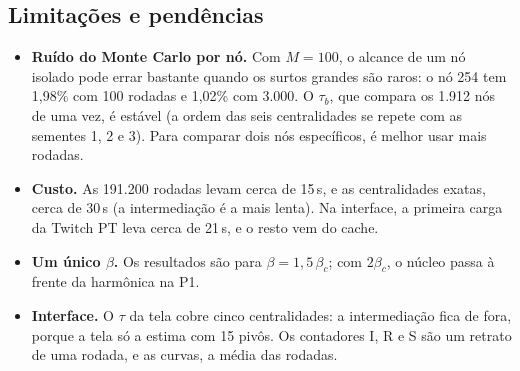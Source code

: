\subsection{Limitações e pendências}
\begin{itemize}[leftmargin=*]
  \item \textbf{Ruído do Monte Carlo por nó.} Com $M = 100$, o alcance de um nó isolado pode
        errar bastante quando os surtos grandes são raros: o nó 254 tem 1,98\% com 100 rodadas e
        1,02\% com 3.000. O $\tau_b$, que compara os 1.912 nós de uma vez, é estável (a ordem das
        seis centralidades se repete com as sementes 1, 2 e 3). Para comparar dois nós específicos,
        é melhor usar mais rodadas.
  \item \textbf{Custo.} As 191.200 rodadas levam cerca de 15\,s, e as centralidades exatas, cerca
        de 30\,s (a intermediação é a mais lenta). Na interface, a primeira carga da Twitch PT leva
        cerca de 21\,s, e o resto vem do cache.
  \item \textbf{Um único $\beta$.} Os resultados são para $\beta = 1{,}5\,\beta_c$; com $2\beta_c$,
        o núcleo passa à frente da harmônica na P1.
  \item \textbf{Interface.} O $\tau$ da tela cobre cinco centralidades: a intermediação fica de fora,
        porque a tela só a estima com 15 pivôs. Os contadores I, R e S são um retrato de uma rodada,
        e as curvas, a média das rodadas.
\end{itemize}

